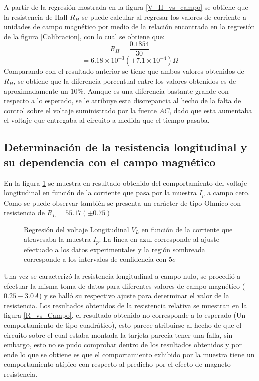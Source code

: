 \documentclass[%
 reprint,
 amsmath,amssymb,
 aps,
]{revtex4-1}
\begin{document}
A partir de la regresión mostrada en la figura \ref{V_H_vs_campo} se obtiene que la resistencia de Hall $R_H$ se puede calcular al regresar los valores de corriente a unidades de campo magnético por medio de la relación encontrada en la regresión de la figura \ref{Calibracion}, con lo cual se obtiene que:
\[R_H=\frac{0.1854}{30}\]
\[=6.18\times 10^{-3} (\pm 7.1\times 10^{-4})\Omega\]
Comparando con el resultado anterior se tiene que ambos valores obtenidos de $R_H$, se obtiene que la diferencia porcentual entre los valores obtenidos es de aproximadamente un $10\%$. Aunque es una diferencia bastante grande con respecto a lo esperado, se le atribuye esta discrepancia al hecho de la falta de control sobre el voltaje suministrado por la fuente $AC$, dado que esta aumentaba el voltaje que entregaba al circuito a medida que el tiempo pasaba. 
\subsection{Determinación de la resistencia longitudinal y su dependencia con el campo magnético}
En la figura \ref{V longitudinal vs ip} se muestra en resultado obtenido del comportamiento del voltaje longitudinal en función de la corriente que pasa por la muestra $I_p$ a campo cero. Como se puede observar también se presenta un carácter de tipo Ohmico con resistencia de $R_L = 55.17 (\pm 0.75)$
\begin{figure}[h!]
\caption{\label{V longitudinal vs ip}Regresión del voltaje Longitudinal $V_L$ en función de la corriente que atravesaba la muestra $I_p$.  La linea en azul corresponde al ajuste efectuado a los datos experimentales y la región sombreada corresponde a los intervalos de confidencia con $5\sigma$}
\end{figure}

Una vez se caracterizó la resistencia longitudinal a campo nulo, se procedió a efectuar la misma toma de datos para diferentes valores de campo magnético ($0.25 - 3.0 A$) y se halló su respectivo ajuste para determinar el valor de la resistencia. Los resultados obtenidos de la resistencia relativa se muestran en la figura \ref{R_vs_Campo}. el resultado obtenido no corresponde a lo esperado (Un comportamiento de tipo cuadrático), esto parece atribuirse al hecho de que el circuito sobre el cual estaba montada la tarjeta parecía tener una falla, sin embargo, esto no se pudo comprobar dentro de los resultados obtenidos y por ende lo que se obtiene es que el comportamiento exhibido por la muestra tiene un comportamiento atípico con respecto al predicho por el efecto de magneto resistencia.
\end{document}

